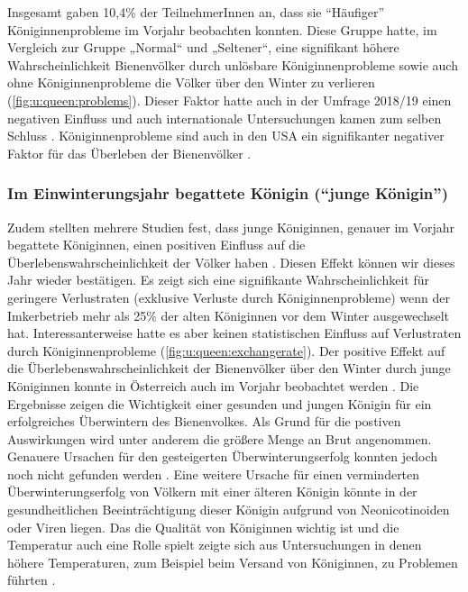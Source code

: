 Insgesamt gaben 10,4\% der TeilnehmerInnen an, dass sie \enquote{Häufiger} Königinnenprobleme im Vorjahr beobachten konnten. Diese Gruppe hatte, im Vergleich zur Gruppe „Normal`` und „Seltener``, eine signifikant höhere Wahrscheinlichkeit Bienenvölker durch unlösbare Königinnenprobleme sowie auch ohne Königinnenprobleme die Völker über den Winter zu verlieren (\cref{fig:u:queen:problems}). Dieser Faktor hatte auch in der Umfrage 2018/19 einen negativen Einfluss \citep{oberreiter2020} und auch internationale Untersuchungen kamen zum selben Schluss \citep{vanderzee2014}. Königinnenprobleme sind auch in den USA ein signifikanter negativer Faktor für das Überleben der Bienenvölker \citep{vanengelsdorp2013}.

\subsubsection{Im Einwinterungsjahr begattete Königin (\enquote{junge Königin})}

Zudem stellten mehrere Studien fest, dass junge Königinnen, genauer im Vorjahr begattete Königinnen, einen positiven Einfluss auf die Überlebenswahrscheinlichkeit der Völker haben \citep{vanderzee2014, genersch2010, giacobino2016, morawetz2019}. Diesen Effekt können wir dieses Jahr wieder bestätigen. Es zeigt sich eine signifikante Wahrscheinlichkeit für geringere Verlustraten (exklusive Verluste durch Königinnenprobleme) wenn der Imkerbetrieb mehr als 25\% der alten Königinnen vor dem Winter ausgewechselt hat. Interessanterweise hatte es aber keinen statistischen Einfluss auf Verlustraten durch Königinnenprobleme (\cref{fig:u:queen:exchangerate}). Der positive Effekt auf die Überlebenswahrscheinlichkeit der Bienenvölker über den Winter durch junge Königinnen konnte in Österreich auch im Vorjahr beobachtet werden \citep{oberreiter2020}. 
\newline
Die Ergebnisse zeigen die Wichtigkeit einer gesunden und jungen Königin für ein erfolgreiches Überwintern des Bienenvolkes. Als Grund für die postiven Auswirkungen wird unter anderem die größere Menge an Brut angenommen. Genauere Ursachen für den gesteigerten Überwinterungserfolg konnten jedoch noch nicht gefunden werden \citep{genersch2010, amiri2017, ricigliano2018}. Eine weitere Ursache für einen verminderten Überwinterungserfolg von Völkern mit einer älteren Königin könnte in der gesundheitlichen Beeinträchtigung dieser Königin aufgrund von Neonicotinoiden \citep{williams2015} oder Viren \citep{amiri2020a} liegen. Das die Qualität von Königinnen wichtig ist und die Temperatur auch eine Rolle spielt zeigte sich aus Untersuchungen in denen höhere Temperaturen, zum Beispiel beim Versand von Königinnen, zu Problemen führten \citep{withrow2019, rousseau2020}.

